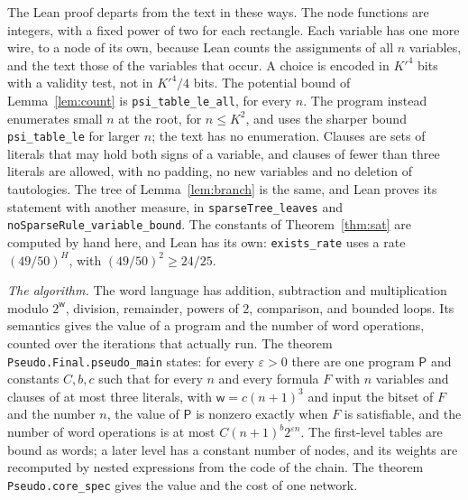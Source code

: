 \documentclass[11pt]{article}
\newcommand{\lean}[1]{\texttt{#1}}
\begin{document}
The Lean proof departs from the text in these ways. The node functions are integers, with a fixed power of two for each rectangle. Each variable has one more wire, to a node of its own, because Lean counts the assignments of all $n$ variables, and the text those of the variables that occur. A choice is encoded in $K'^4$ bits with a validity test, not in $K'^4/4$ bits. The potential bound of Lemma~\ref{lem:count} is \lean{psi\_table\_le\_all}, for every $n$. The program instead enumerates small $n$ at the root, for $n\le K^2$, and uses the sharper bound \lean{psi\_table\_le} for larger $n$; the text has no enumeration. Clauses are sets of literals that may hold both signs of a variable, and clauses of fewer than three literals are allowed, with no padding, no new variables and no deletion of tautologies. The tree of Lemma~\ref{lem:branch} is the same, and Lean proves its statement with another measure, in \lean{sparseTree\_leaves} and \lean{noSparseRule\_variable\_bound}. The constants of Theorem~\ref{thm:sat} are computed by hand here, and Lean has its own: \lean{exists\_rate} uses a rate $(49/50)^H$, with $(49/50)^2\ge24/25$.

\medskip\noindent\emph{The algorithm.} The word language has addition, subtraction and multiplication modulo $2^{\mathsf w}$, division, remainder, powers of $2$, comparison, and bounded loops. Its semantics gives the value of a program and the number of word operations, counted over the iterations that actually run. The theorem \lean{Pseudo.Final.pseudo\_main} states: for every $\varepsilon>0$ there are one program $\mathsf P$ and constants $C,b,c$ such that for every $n$ and every formula $F$ with $n$ variables and clauses of at most three literals, with $\mathsf w=c(n+1)^3$ and input the bitset of $F$ and the number $n$, the value of $\mathsf P$ is nonzero exactly when $F$ is satisfiable, and the number of word operations is at most $C(n+1)^b2^{\varepsilon n}$. The first-level tables are bound as words; a later level has a constant number of nodes, and its weights are recomputed by nested expressions from the code of the chain. The theorem \lean{Pseudo.core\_spec} gives the value and the cost of one network.
\end{document}
